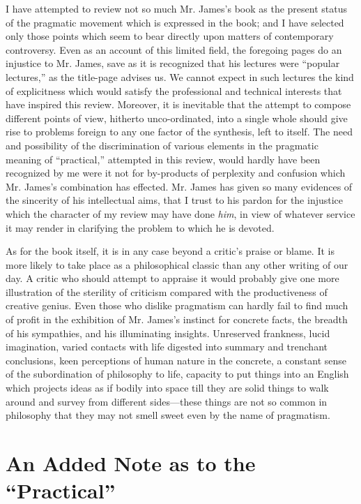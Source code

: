 \documentclass[12pt]{article}
\begin{document}
I have attempted to review not so much Mr. James's book as the present
status of the pragmatic movement which is expressed in the book; and I
have selected only those points which seem to bear directly upon
matters of contemporary controversy. Even as an account of this
limited field, the foregoing pages do an injustice to Mr. James, save
as it is recognized that his lectures were ``popular lectures,'' as the
title-page advises us. We cannot expect in such lectures the kind of
explicitness which would satisfy the professional and technical
interests that have inspired this review. Moreover, it is inevitable
that the attempt to compose different points of view, hitherto
unco-ordinated, into a single whole should give rise to problems
foreign to any one factor of the synthesis, left to itself. The need
and possibility of the discrimination of various elements in the
pragmatic meaning of ``practical,'' attempted in this review, would
hardly have been recognized by me were it not for by-products of
perplexity and confusion which Mr. James's combination has effected.
Mr. James has given so many evidences of the sincerity of his
intellectual aims, that I trust to his pardon for the injustice which
the character of my review may have done \emph{him}, in view of whatever
service it may render in clarifying the problem to which he is
devoted.


As for the book itself, it is in any case beyond a critic's praise or
blame. It is more likely to take place as a philosophical classic than
any other writing of our day. A critic who should attempt to appraise
it would probably give one more illustration of the sterility of
criticism compared with the productiveness of creative genius. Even
those who dislike pragmatism can hardly fail to find much of profit in
the exhibition of Mr. James's instinct for concrete facts, the breadth
of his sympathies, and his illuminating insights. Unreserved
frankness, lucid imagination, varied contacts with life digested into
summary and trenchant conclusions, keen perceptions of human nature in
the concrete, a constant sense of the subordination of philosophy to
life, capacity to put things into an English which projects ideas as
if bodily into space till they are solid things to walk around and
survey from different sides---these things are not so common in
philosophy that they may not smell sweet even by the name of
pragmatism.


\section*{An Added Note as to the ``Practical''}
\end{document}
